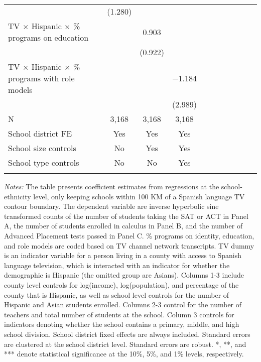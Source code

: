 \begin{table}[!htbp]
{\begin{threeparttable}
\begin{tabular}{lcccccccccc}
				  & (1.280) &  &  \\
				 TV $\times$ Hispanic $\times$ \% programs on education &  & 0.903 &  \\ 
				  &  & (0.922) &  \\ 
				 TV $\times$ Hispanic $\times$ \% programs with role models &  &  & $-$1.184 \\ 
				  &  &  & (2.989) \\ 
				  \addlinespace\hline
				N & 3,168 & 3,168 & 3,168 \\ 
				\hline\hline\addlinespace
				School district FE & Yes & Yes  & Yes\\
                                	School size controls & No & Yes & Yes\\
                                	School type controls & No & No & Yes \\
					\addlinespace\hline\hline
			\end{tabular}
			\begin{tablenotes}[flushleft]
				\item \textit{Notes:} The table presents coefficient estimates from regressions at the school-ethnicity level, only keeping schools within 100 KM of a Spanish language TV contour boundary. The dependent variable are inverse hyperbolic sine transformed counts of the number of students taking the SAT or ACT in Panel A, the number of students enrolled in calculus in Panel B, and the number of Advanced Placement tests passed in Panel C. \% programs on identity, education, and role models are coded based on TV channel network transcripts. TV dummy is an indicator variable for a person living in a county with access to Spanish language television, which is interacted with an indicator for whether the demographic is Hispanic (the omitted group are Asians). Columns 1-3 include county level controls for log(income), log(population), and percentage of the county that is Hispanic, as well as school level controls for the number of Hispanic and Asian students enrolled. Columns 2-3 control for the number of teachers and total number of students at the school. Column 3 controls for indicators denoting whether the school contains a primary, middle, and high school division. School district fixed effects are always included. Standard errors are clustered at the school district level. Standard errors are robust. *, **, and *** denote statistical significance at the 10\%, 5\%, and 1\% levels, respectively.
			\end{tablenotes}
		\end{threeparttable}
	}
\end{table}